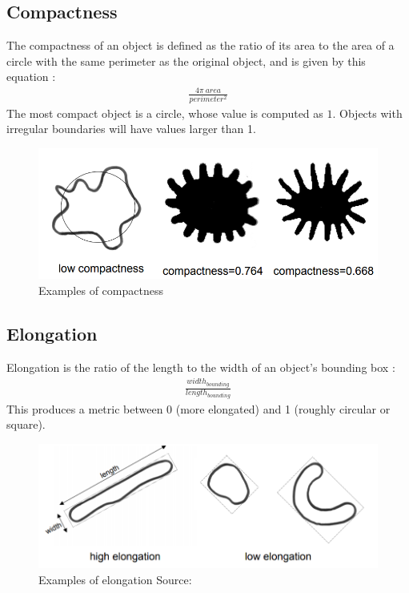 \documentclass[letterpaper]{article}
\begin{document}
{\subsection{Compactness}
The compactness of an object is defined as the ratio of its area to the area of a circle with the same perimeter as the original object, and is given by this equation \cite{Wirth2004-li}:
\begin{eqnarray*}
\frac {4 \pi\ area} {perimeter^2}
\end{eqnarray*} 
The most compact object is a circle, whose value is computed as $1$.  Objects with irregular boundaries will have values larger than 1. 
\begin{figure}[H]
	\centering
	\includegraphics[width=0.4\linewidth]{./figures/compactness.png}
	\caption{Examples of compactness \protect\cite{Wirth2004-li}}
	\label{fig:compactness}
\end{figure}

\subsection{Elongation}
Elongation is the ratio of the length to the width of an object's bounding box \cite{Wirth2004-li}:
\begin{eqnarray*}
\frac {width_{bounding}} {length_{bounding}}
\end{eqnarray*}
This produces a metric between 0 (more elongated) and 1 (roughly circular or square).
\begin{figure}[H]
	\centering
	\includegraphics[width=0.4\linewidth]{./figures/elongation.png}
	\caption{Examples of elongation Source: \protect\cite{Wirth2004-li} }
	\label{fig:elongation}
\end{figure}
}
\end{document}
